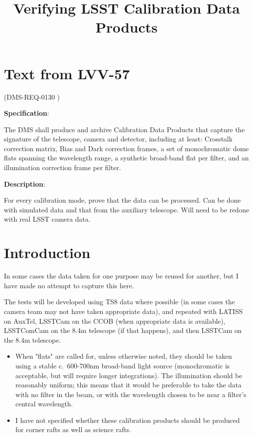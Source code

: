 \documentclass[DM,authoryear,toc,lsstdraft]{lsstdoc}
\title{Verifying LSST Calibration Data Products}
\date{\vcsDate}
\begin{document}

\maketitle

\renewcommand{\secRef}[1]{Sec. \ref{#1}}
\section{Text from LVV-57}

(DMS-REQ-0130 )

\textbf{Specification}:

The DMS shall produce and archive Calibration Data Products that capture the signature of the
telescope, camera and detector, including at least: Crosstalk correction matrix, Bias and Dark correction
frames, a set of monochromatic dome flats spanning the wavelength range, a synthetic broad-band flat per
filter, and an illumination correction frame per filter.

\textbf{Description}:

For every calibration mode, prove that the data can be processed. Can be done with simulated data and that
from the auxiliary telescope. Will need to be redone with real LSST camera data.

\section{Introduction}

In some cases the data taken for one purpose may be reused for another, but I have made no attempt to
capture this here.

The tests will be developed using TS8 data where possible (in some cases the camera team may not have taken
appropriate data), and repeated with LATISS \citep{10.71929/rubin/2571930} on AuxTel, LSSTCam \citep{10.71929/rubin/2571927} on the CCOB (when appropriate data is available), LSSTComCam \citep{10.71929/rubin/2561361}
on the 8.4m telescope (if that happens), and then LSSTCam on the 8.4m telescope.

\begin{itemize}
\item When "flats" are called for, unless otherwise noted, they should be taken using a stable c.\ 600-700nm
broad-band light source (monochromatic is acceptable, but will require longer integrations). The illumination
should be reasonably uniform; this means that it would be preferable to take the data with no filter in the
beam, or with the wavelength chosen to be near a filter's central wavelength.

\item I have not specified whether these calibration products should be produced for corner rafts as well as science rafts.
\end{itemize}
\end{document}
